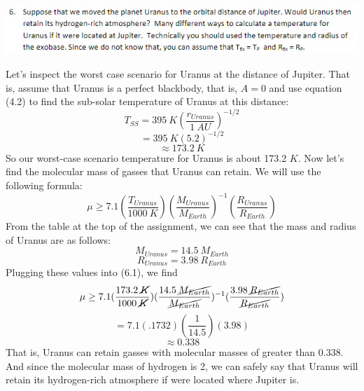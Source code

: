 \documentclass{article}
\begin{document}
\section{}
\includegraphics[scale = 0.8]{probset3num6.PNG}

Let's inspect the worst case scenario for Uranus at the distance of Jupiter. That is, assume that Uranus is a perfect blackbody, that is, $A = 0$ and use equation (4.2) to find the sub-solar temperature of Uranus at this distance:
\[T_{SS} = 395 \:K(\frac{r_{Uranus}}{1 \: AU})^{-1/2}\]
\[ = 395 \: K (5.2)^{-1/2}\]
\[ \approx 173.2 \:K\]
So our worst-case scenario temperature for Uranus is about 173.2 $K$. Now let's find the molecular mass of gasses that Uranus can retain. We will use the following formula:
\begin{equation}
    \mu \geq 7.1 (\frac{T_{Uranus}}{1000 \:K})(\frac{M_{Uranus}}{M_{Earth}})^{-1}(\frac{R_{Uranus}}{R_{Earth}})
\end{equation}
From the table at the top of the assignment, we can see that the mass and radius of Uranus are as follows:
\[M_{Uranus} = 14.5 \:M_{Earth}\]
\[R_{Uranus} = 3.98 \: R_{Earth}\]
Plugging these values into (6.1), we find
\[\mu \geq 7.1(\frac{173.2 \:\cancel{K}}{1000 \: \cancel{K}})(\frac{14.5 \:\cancel{M_{Earth}}}{\cancel{M_{Earth}}})^{-1}(\frac{3.98 \:\cancel{R_{Earth}}}{\cancel{R_{Earth}}})\]
\[ = 7.1(.1732)(\frac{1}{14.5})(3.98)\]
\[\approx 0.338\]
That is, Uranus can retain gasses with molecular masses of greater than 0.338. And since the molecular mass of hydrogen is 2, we can safely say that Uranus will retain its hydrogen-rich atmosphere if were located where Jupiter is.
\end{document}
